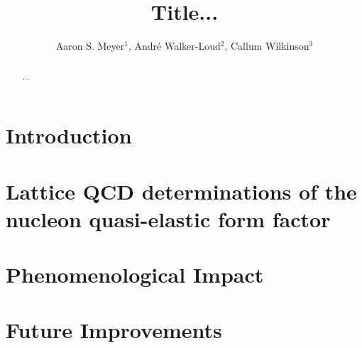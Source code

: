 \documentclass{ar-1col}
\begin{document}

\title{Title...}

\author{Aaron S. Meyer$^1$,
Andr\'{e} Walker-Loud$^2$,
Callum Wilkinson$^3$
}

\begin{abstract}
  ...
\end{abstract}

\begin{keywords}
\end{keywords}

\maketitle

\tableofcontents


\section{Introduction\label{sec:intro}}



\section{Lattice QCD determinations of the nucleon quasi-elastic form factor\label{sec:lqcd}}



\section{Phenomenological Impact\label{sec:impact}}



\section{Future Improvements\label{sec:future}}

\end{document}
